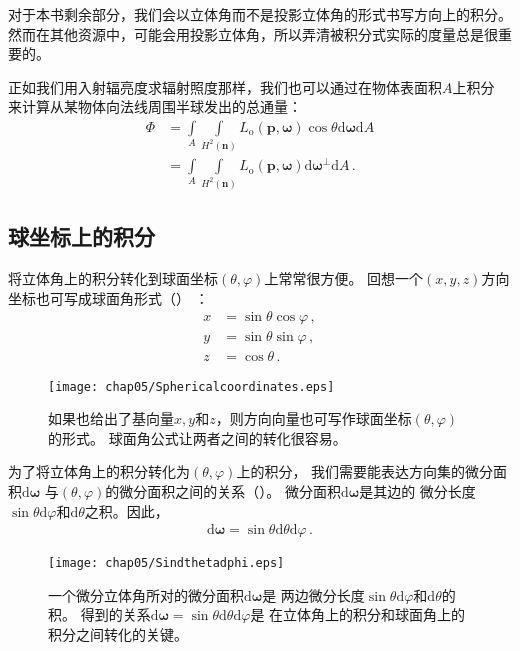 对于本书剩余部分，我们会以立体角而不是投影立体角的形式书写方向上的积分。
然而在其他资源中，可能会用投影立体角，所以弄清被积分式实际的度量总是很重要的。

正如我们用入射辐亮度求辐射照度那样，我们也可以通过在物体表面积$A$上积分
来计算从某物体向法线周围半球发出的总通量：
\begin{align*}
    \varPhi & =\int\limits_A{\int\limits_{H^2({\bm n})}L_{\mathrm{o}}({\bm p},{\bm\omega})\cos\theta\mathrm{d}{\bm\omega}\mathrm{d}A}   \\
            & =\int\limits_A{\int\limits_{H^2({\bm n})}L_{\mathrm{o}}({\bm p},{\bm\omega})\mathrm{d}{\bm\omega}^{\perp}\mathrm{d}A}\, .
\end{align*}

\subsection{球坐标上的积分}
将立体角上的积分转化到球面坐标$(\theta,\varphi)$上常常很方便。
回想一个$(x,y,z)$方向坐标也可写成球面角形式（）
：
\begin{align*}
    x & =\sin\theta\cos\varphi\, , \\
    y & =\sin\theta\sin\varphi\, , \\
    z & =\cos\theta\, .
\end{align*}
\begin{figure}[htbp]
    \centering\texttt{[image: chap05/Sphericalcoordinates.eps]}
    \caption{如果也给出了基向量$x,y$和$z$，则方向向量也可写作球面坐标$(\theta,\varphi)$的形式。
        球面角公式让两者之间的转化很容易。}
    \label{fig:5.14}
\end{figure}

为了将立体角上的积分转化为$(\theta,\varphi)$上的积分，
我们需要能表达方向集的微分面积$\mathrm{d}\bm\omega$
与$(\theta,\varphi)$的微分面积之间的关系（）。
微分面积$\mathrm{d}\bm\omega$是其边的
微分长度$\sin\theta\mathrm{d}\varphi$和$\mathrm{d}\theta$之积。因此，
\begin{align}\label{eq:5.5}
    \mathrm{d}{\bm\omega}=\sin\theta\mathrm{d}\theta\mathrm{d}\varphi\, .
\end{align}
\begin{figure}[htbp]
    \centering\texttt{[image: chap05/Sindthetadphi.eps]}
    \caption{一个微分立体角所对的微分面积$\mathrm{d}\bm\omega$是
        两边微分长度$\sin\theta\mathrm{d}\varphi$和$\mathrm{d}\theta$的积。
        得到的关系$\mathrm{d}{\bm\omega}=\sin\theta\mathrm{d}\theta\mathrm{d}\varphi$是
        在立体角上的积分和球面角上的积分之间转化的关键。}
    \label{fig:5.15}
\end{figure}

